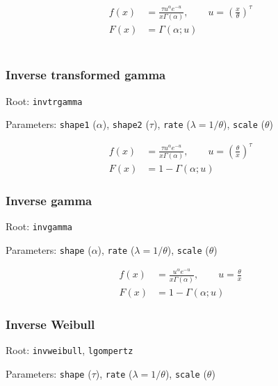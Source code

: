 \documentclass[x11names]{article}
\newcommand{\code}[1]{\texttt{#1}}
\begin{document}
\begin{align*}
  f(x) &= \frac{\tau u^\alpha e^{-u}}{x \Gamma(\alpha)},
  \qquad u = \left( \frac{x}{\theta} \right)^\tau \\
  F(x) &= \Gamma (\alpha ; u)
\end{align*} \\

\subsubsection*{Inverse transformed gamma}

\begin{compactitem}[]
\item Root: \code{invtrgamma}
\item Parameters: \code{shape1} ($\alpha$),
      \code{shape2} ($\tau$),
      \code{rate}   ($\lambda = 1/\theta$),
      \code{scale}  ($\theta$)
\end{compactitem}

\begin{align*}
  f(x) &= \frac{\tau u^\alpha e^{-u}}{x\Gamma (\alpha)},
  \qquad u = \left( \frac{\theta}{x} \right)^\tau \\
  F(x) &= 1 - \Gamma (\alpha ; u)
\end{align*}

\subsubsection*{Inverse gamma}

\begin{compactitem}[]
\item Root: \code{invgamma}
\item Parameters: \code{shape} ($\alpha$),
      \code{rate}   ($\lambda = 1/\theta$),
      \code{scale}  ($\theta$)
\end{compactitem}

\begin{align*}
  f(x) &= \frac{u^\alpha e^{-u}}{x\Gamma (\alpha)},
  \qquad u = \frac{\theta}{x}\\
  F(x) &= 1 - \Gamma (\alpha ; u)
\end{align*}


\subsubsection*{Inverse Weibull}

\begin{compactitem}[]
\item Root: \code{invweibull}, \code{lgompertz}
\item Parameters: \code{shape} ($\tau$),
      \code{rate}   ($\lambda = 1/\theta$),
      \code{scale}  ($\theta$)
\end{compactitem}
\end{document}
